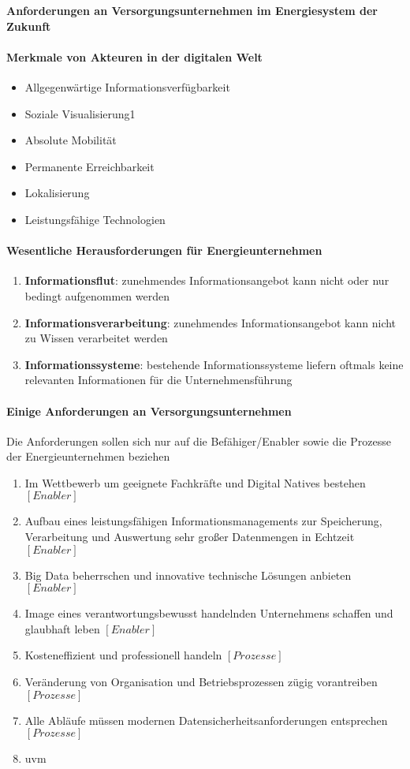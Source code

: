 \textbf{Anforderungen an Versorgungsunternehmen im Energiesystem der Zukunft \citep[S. 19]{Doleski2016}}

\paragraph{Merkmale von Akteuren in der digitalen Welt}
\begin{itemize}
  \item Allgegenwärtige Informationsverfügbarkeit
  \item Soziale Visualisierung1
  \item Absolute Mobilität
  \item Permanente Erreichbarkeit
  \item Lokalisierung
  \item Leistungsfähige Technologien
\end{itemize}

\paragraph{Wesentliche Herausforderungen für Energieunternehmen \citep[S. 21]{Doleski2016}}
\begin{enumerate}
  \item \textbf{Informationsflut}: zunehmendes Informationsangebot kann nicht oder nur bedingt aufgenommen werden
  \item \textbf{Informationsverarbeitung}: zunehmendes Informationsangebot kann nicht zu Wissen verarbeitet werden
  \item \textbf{Informationssysteme}: bestehende Informationssysteme liefern oftmals keine relevanten Informationen für die Unternehmensführung
\end{enumerate}
%


\paragraph{Einige Anforderungen an Versorgungsunternehmen}
Die Anforderungen sollen sich nur auf die Befähiger/Enabler sowie die Prozesse der Energieunternehmen beziehen
\begin{enumerate}
  \item Im Wettbewerb um geeignete Fachkräfte und Digital Natives bestehen $[Enabler]$
  \item Aufbau eines leistungsfähigen Informationsmanagements zur Speicherung, Verarbeitung und Auswertung sehr großer Datenmengen in Echtzeit $[Enabler]$
  \item Big Data beherrschen und innovative technische Lösungen anbieten $[Enabler]$
  \item Image eines verantwortungsbewusst handelnden Unternehmens schaffen und glaubhaft leben $[Enabler]$
  \item Kosteneffizient und professionell handeln $[Prozesse]$
  \item Veränderung von Organisation und Betriebsprozessen zügig vorantreiben $[Prozesse]$
  \item Alle Abläufe müssen modernen Datensicherheitsanforderungen entsprechen $[Prozesse]$
  \item uvm
\end{enumerate}
